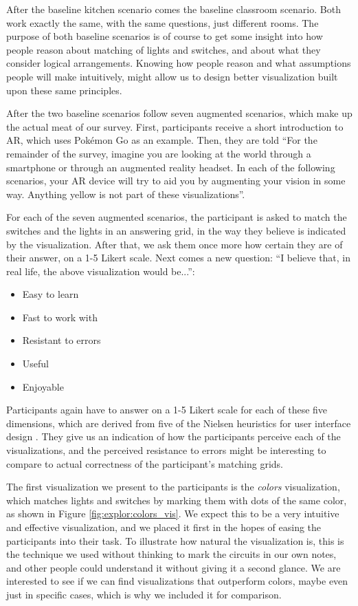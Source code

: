     After the baseline kitchen scenario comes the baseline classroom scenario. Both work exactly the same, with the same questions, just different rooms. The purpose of both baseline scenarios is of course to get some insight into how people reason about matching of lights and switches, and about what they consider logical arrangements. Knowing how people reason and what assumptions people will make intuitively, might allow us to design better visualization built upon these same principles.
    
    After the two baseline scenarios follow seven augmented scenarios, which make up the actual meat of our survey. First, participants receive a short introduction to AR, which uses Pokémon Go as an example. Then, they are told ``For the remainder of the survey, imagine you are looking at the world through a smartphone or through an augmented reality headset. In each of the following scenarios, your AR device will try to aid you by augmenting your vision in some way. Anything yellow is not part of these visualizations''.
    
    For each of the seven augmented scenarios, the participant is asked to match the switches and the lights in an answering grid, in the way they believe is indicated by the visualization. After that, we ask them once more how certain they are of their answer, on a 1-5 Likert scale. Next comes a new question: ``I believe that, in real life, the above visualization would be...'':
    \begin{itemize}
        \item Easy to learn
        \item Fast to work with
        \item Resistant to errors
        \item Useful
        \item Enjoyable
    \end{itemize}
    Participants again have to answer on a 1-5 Likert scale for each of these five dimensions, which are derived from five of the Nielsen heuristics for user interface design \cite{nielsen1990heuristic}. They give us an indication of how the participants perceive each of the visualizations, and the perceived resistance to errors might be interesting to compare to actual correctness of the participant's matching grids.
    
    The first visualization we present to the participants is the \textit{colors} visualization, which matches lights and switches by marking them with dots of the same color, as shown in Figure \ref{fig:explor:colors_vis}. We expect this to be a very intuitive and effective visualization, and we placed it first in the hopes of easing the participants into their task. To illustrate how natural the visualization is, this is the technique we used without thinking to mark the circuits in our own notes, and other people could understand it without giving it a second glance. We are interested to see if we can find visualizations that outperform colors, maybe even just in specific cases, which is why we included it for comparison.
    
